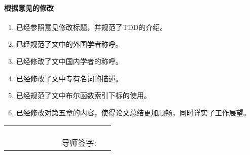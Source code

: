 \documentclass{article} %
\begin{document}
\paragraph{根据意见的修改}
\begin{enumerate}
    \item 已经参照意见修改标题，并规范了TDD的介绍。
    \item 已经规范了文中的外国学者称呼。
    \item 已经修改了文中国内学者的称呼。
    \item 已经修改了文中专有名词的描述。
    \item 已经规范了文中布尔函数索引下标的使用。
    \item 已经修改对第五章的内容，使得论文总结更加顺畅，同时详实了工作展望。
\end{enumerate}
 \begin{tabular}{p{0.4\linewidth} p{0.4\linewidth}}
    & \\
    & \\
    & \\
	     & \centering 导师签字: \\
\end{tabular}
\end{document}
